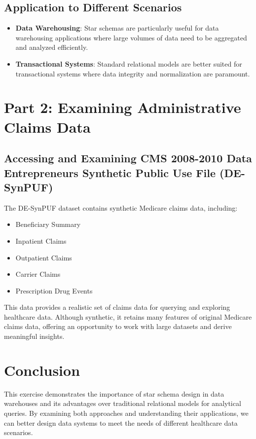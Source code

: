 \documentclass{article}
\begin{document}
\subsection*{Application to Different Scenarios}

\begin{itemize}
    \item \textbf{Data Warehousing}: Star schemas are particularly useful for data warehousing applications where large volumes of data need to be aggregated and analyzed efficiently.
    \item \textbf{Transactional Systems}: Standard relational models are better suited for transactional systems where data integrity and normalization are paramount.
\end{itemize}

\section*{Part 2: Examining Administrative Claims Data}

\subsection*{Accessing and Examining CMS 2008-2010 Data Entrepreneurs Synthetic Public Use File (DE-SynPUF)}

The DE-SynPUF dataset contains synthetic Medicare claims data, including:

\begin{itemize}
    \item Beneficiary Summary
    \item Inpatient Claims
    \item Outpatient Claims
    \item Carrier Claims
    \item Prescription Drug Events
\end{itemize}

This data provides a realistic set of claims data for querying and exploring healthcare data. Although synthetic, it retains many features of original Medicare claims data, offering an opportunity to work with large datasets and derive meaningful insights.

\section*{Conclusion}

This exercise demonstrates the importance of star schema design in data warehouses and its advantages over traditional relational models for analytical queries. By examining both approaches and understanding their applications, we can better design data systems to meet the needs of different healthcare data scenarios.
\end{document}
